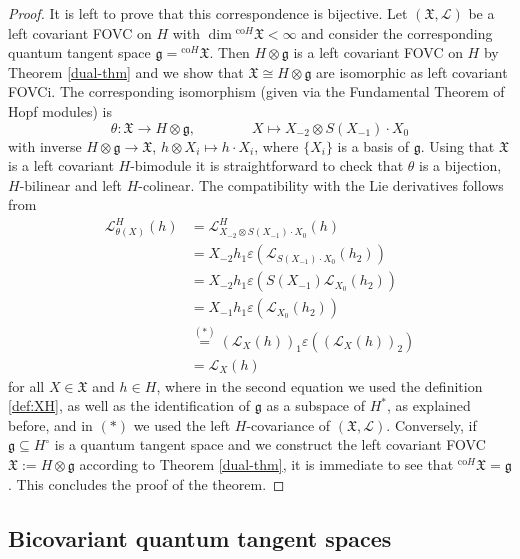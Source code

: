 \documentclass{article}
\theoremstyle{definition}
\begin{document}
\begin{proof}
		It is left to prove that this correspondence is bijective. Let $(\mathfrak{X},\mathscr{L})$ be a left covariant FOVC on $H$ with $\dim{}^{\mathrm{co}H}\mathfrak{X}<\infty$ and consider the corresponding quantum tangent space $\mathfrak{g}={}^{\mathrm{co}H}\mathfrak{X}$. Then $H\otimes\mathfrak{g}$ is a left covariant FOVC on $H$ by Theorem \ref{dual-thm} and we show that $\mathfrak{X}\cong H\otimes\mathfrak{g}$ are isomorphic as left covariant FOVCi. The corresponding isomorphism (given via the Fundamental Theorem of Hopf modules) is 
		$$
		\theta\colon\mathfrak{X}\to H\otimes\mathfrak{g},\qquad\qquad
		X\mapsto X_{-2}\otimes S(X_{-1})\cdot X_0
		$$
		with inverse $H\otimes\mathfrak{g}\to\mathfrak{X}$, $h\otimes X_i\mapsto h\cdot X_i$, where $\{X_i\}$ is a basis of $\mathfrak{g}$. Using that $\mathfrak{X}$ is a left covariant $H$-bimodule it is straightforward to check that $\theta$ is a bijection, $H$-bilinear and left $H$-colinear. The compatibility with the Lie derivatives follows from
		\begin{align*}
			\mathscr{L}^H_{\theta(X)}(h)
			&=\mathscr{L}^H_{X_{-2}\otimes S(X_{-1})\cdot X_0}(h)\\
			&=X_{-2}h_1\varepsilon(\mathscr{L}_{S(X_{-1})\cdot X_0}(h_2))\\
			&=X_{-2}h_1\varepsilon(S(X_{-1})\mathscr{L}_{X_0}(h_2))\\
			&=X_{-1}h_1\varepsilon(\mathscr{L}_{X_0}(h_2))\\
			&\overset{(*)}{=}(\mathscr{L}_X(h))_1\varepsilon((\mathscr{L}_X(h))_2)\\
			&=\mathscr{L}_X(h)
		\end{align*}
		for all $X\in\mathfrak{X}$ and $h\in H$, where in the second equation we used the definition \eqref{def:XH}, as well as the identification of $\mathfrak{g}$ as a subspace of $H^*$, as explained before, and in $(*)$ we used the left $H$-covariance of $(\mathfrak{X},\mathscr{L})$. Conversely, if $\mathfrak{g}\subseteq H^\circ$ is a quantum tangent space and we construct the left covariant FOVC $\mathfrak{X}:=H\otimes\mathfrak{g}$ according to Theorem \ref{dual-thm}, it is immediate to see that ${}^{\mathrm{co}H}\mathfrak{X}=\mathfrak{g}$. This concludes the proof of the theorem.
	\end{proof}
	
	\subsection{Bicovariant quantum tangent spaces}\label{sec:bicov}
	
\end{document}

